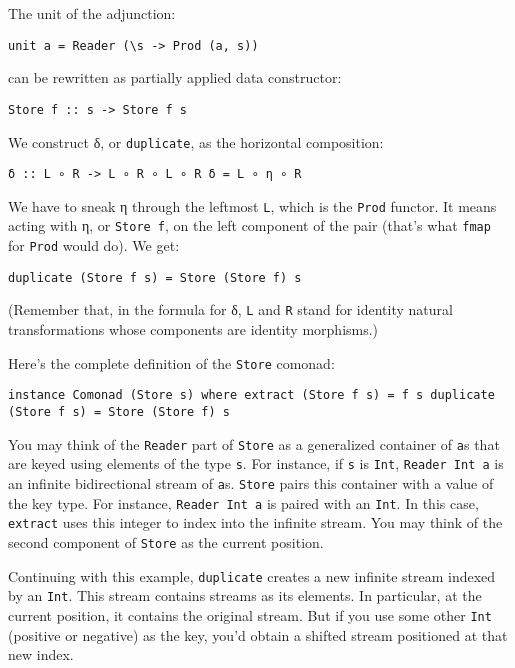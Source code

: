 The unit of the adjunction:

\begin{verbatim}
unit a = Reader (\s -> Prod (a, s))
\end{verbatim}

can be rewritten as partially applied data constructor:

\begin{verbatim}
Store f :: s -> Store f s
\end{verbatim}

We construct δ, or \texttt{duplicate}, as the horizontal composition:

\begin{verbatim}
δ :: L ∘ R -> L ∘ R ∘ L ∘ R δ = L ∘ η ∘ R
\end{verbatim}

We have to sneak η through the leftmost \texttt{L}, which is the
\texttt{Prod} functor. It means acting with η, or \texttt{Store\ f}, on
the left component of the pair (that's what \texttt{fmap} for
\texttt{Prod} would do). We get:

\begin{verbatim}
duplicate (Store f s) = Store (Store f) s
\end{verbatim}

(Remember that, in the formula for δ, \texttt{L} and \texttt{R} stand
for identity natural transformations whose components are identity
morphisms.)

Here's the complete definition of the \texttt{Store} comonad:

\begin{verbatim}
instance Comonad (Store s) where extract (Store f s) = f s duplicate (Store f s) = Store (Store f) s
\end{verbatim}

You may think of the \texttt{Reader} part of \texttt{Store} as a
generalized container of \texttt{a}s that are keyed using elements of
the type \texttt{s}. For instance, if \texttt{s} is \texttt{Int},
\texttt{Reader\ Int\ a} is an infinite bidirectional stream of
\texttt{a}s. \texttt{Store} pairs this container with a value of the key
type. For instance, \texttt{Reader\ Int\ a} is paired with an
\texttt{Int}. In this case, \texttt{extract} uses this integer to index
into the infinite stream. You may think of the second component of
\texttt{Store} as the current position.

Continuing with this example, \texttt{duplicate} creates a new infinite
stream indexed by an \texttt{Int}. This stream contains streams as its
elements. In particular, at the current position, it contains the
original stream. But if you use some other \texttt{Int} (positive or
negative) as the key, you'd obtain a shifted stream positioned at that
new index.

